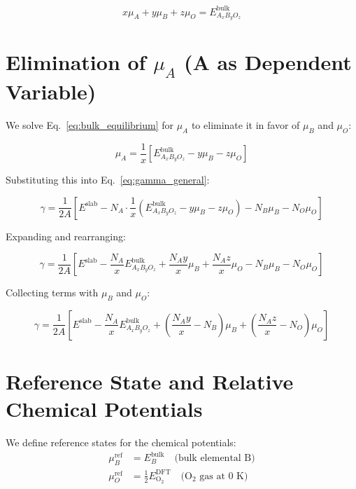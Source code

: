 \documentclass[11pt]{article}
\begin{document}
\begin{equation}
x \mu_A + y \mu_B + z \mu_O = E_{A_xB_yO_z}^{\text{bulk}}
\label{eq:bulk_equilibrium}
\end{equation}

\section{Elimination of $\mu_A$ (A as Dependent Variable)}

We solve Eq.~\ref{eq:bulk_equilibrium} for $\mu_A$ to eliminate it in favor of $\mu_B$ and $\mu_O$:

\begin{equation}
\mu_A = \frac{1}{x} \left[ E_{A_xB_yO_z}^{\text{bulk}} - y \mu_B - z \mu_O \right]
\label{eq:mu_A_elimination}
\end{equation}

Substituting this into Eq.~\ref{eq:gamma_general}:

\begin{equation}
\gamma = \frac{1}{2A} \left[ E^{\text{slab}} - N_A \cdot \frac{1}{x}\left( E_{A_xB_yO_z}^{\text{bulk}} - y \mu_B - z \mu_O \right) - N_B \mu_B - N_O \mu_O \right]
\label{eq:gamma_substituted}
\end{equation}

Expanding and rearranging:

\begin{equation}
\gamma = \frac{1}{2A} \left[ E^{\text{slab}} - \frac{N_A}{x} E_{A_xB_yO_z}^{\text{bulk}} + \frac{N_A y}{x} \mu_B + \frac{N_A z}{x} \mu_O - N_B \mu_B - N_O \mu_O \right]
\label{eq:gamma_expanded}
\end{equation}

Collecting terms with $\mu_B$ and $\mu_O$:

\begin{equation}
\gamma = \frac{1}{2A} \left[ E^{\text{slab}} - \frac{N_A}{x} E_{A_xB_yO_z}^{\text{bulk}} + \left(\frac{N_A y}{x} - N_B\right) \mu_B + \left(\frac{N_A z}{x} - N_O\right) \mu_O \right]
\label{eq:gamma_collected}
\end{equation}

\section{Reference State and Relative Chemical Potentials}

We define reference states for the chemical potentials:
\begin{align}
\mu_B^{\text{ref}} &= E_B^{\text{bulk}} \quad \text{(bulk elemental B)} \label{eq:mu_B_ref} \\
\mu_O^{\text{ref}} &= \frac{1}{2} E_{\text{O}_2}^{\text{DFT}} \quad \text{(O$_2$ gas at 0 K)} \label{eq:mu_O_ref}
\end{align}
\end{document}

